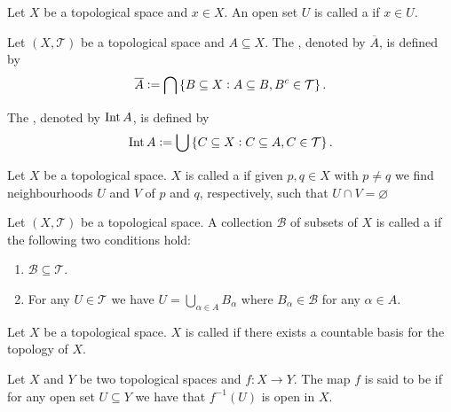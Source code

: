\begin{definition}
	Let $X$ be a topological space and $x \in X$. An open set $U$ is called a  if $x \in U$.
\end{definition}

\begin{definition}
	Let $(X,\mathcal{T})$ be a topological space and $A \subseteq X$. The , denoted by $\overline{A}$, is defined by 
	\begin{equation}
		\overline{A} := \bigcap\cbr[0]{B \subseteq X : A \subseteq B, B^c \in \mathcal{T}}.
	\end{equation}

	The , denoted by $\operatorname{Int} A$, is defined by 
	\begin{equation}
		\Int A := \bigcup\cbr[0]{C \subseteq X: C \subseteq A, C \in \mathcal{T}}.	
	\end{equation}
\end{definition}

\begin{definition}
	Let $X$ be a topological space. $X$ is called a  if given $p,q \in X$ with $p \neq q$ we find neighbourhoods $U$ and $V$ of $p$ and $q$, respectively, such that $U \cap V = \varnothing$	
\end{definition}

\begin{definition}
	Let $(X,\mathcal{T})$ be a topological space. A collection $\mathcal{B}$ of subsets of $X$ is called a  if the following two conditions hold:

	\begin{enumerate}
		\item $\mathcal{B} \subseteq \mathcal{T}$.
		\item For any $U \in \mathcal{T}$ we have $U = \bigcup_{\alpha \in A} B_\alpha$ where $B_\alpha \in \mathcal{B}$ for any $\alpha \in A$.
	\end{enumerate}
	\label{def:basis_topology}
\end{definition}

\begin{definition}
	Let $X$ be a topological space. $X$ is called  if there exists a countable basis for the topology of $X$.
\end{definition}

\begin{definition}
	Let $X$ and $Y$ be two topological spaces and $f: X \to Y$. The map $f$ is said to be  if for any open set $U \subseteq Y$ we have that $f^{-1}(U)$ is open in $X$.
\end{definition}

